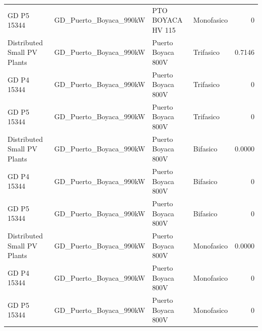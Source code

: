 \documentclass[11pt,a4paper]{article}
\begin{document}
\begin{longtable}{llllr}
GD P5 15344 & GD\_Puerto\_Boyaca\_990kW & PTO BOYACA HV 115 & Monofasico & 0 \\
Distributed Small PV Plants & GD\_Puerto\_Boyaca\_990kW & Puerto Boyaca 800V & Trifasico & 0.7146 \\
GD P4 15344 & GD\_Puerto\_Boyaca\_990kW & Puerto Boyaca 800V & Trifasico & 0 \\
GD P5 15344 & GD\_Puerto\_Boyaca\_990kW & Puerto Boyaca 800V & Trifasico & 0 \\
Distributed Small PV Plants & GD\_Puerto\_Boyaca\_990kW & Puerto Boyaca 800V & Bifasico & 0.0000 \\
GD P4 15344 & GD\_Puerto\_Boyaca\_990kW & Puerto Boyaca 800V & Bifasico & 0 \\
GD P5 15344 & GD\_Puerto\_Boyaca\_990kW & Puerto Boyaca 800V & Bifasico & 0 \\
Distributed Small PV Plants & GD\_Puerto\_Boyaca\_990kW & Puerto Boyaca 800V & Monofasico & 0.0000 \\
GD P4 15344 & GD\_Puerto\_Boyaca\_990kW & Puerto Boyaca 800V & Monofasico & 0 \\
GD P5 15344 & GD\_Puerto\_Boyaca\_990kW & Puerto Boyaca 800V & Monofasico & 0 \\
\end{longtable}
\end{document}

